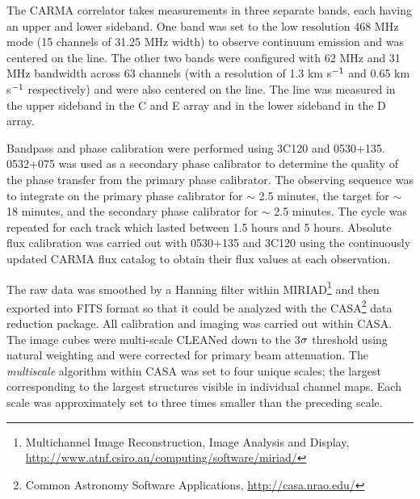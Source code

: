 \documentclass[iop]{emulateapj}
\begin{document}
The CARMA correlator takes measurements in three separate bands, each having an upper and lower sideband. One band was set to the low resolution 468 MHz mode (15 channels of 31.25 MHz width) to observe continuum emission and was centered on the line. The other two bands were configured with 62 MHz and 31 MHz bandwidth across 63 channels (with a resolution of 1.3 km s$\rm{{}^{-1}}$ and 0.65 km s$\rm{{}^{-1}}$ respectively) and were also centered on the line. The line was measured in the upper sideband in the C and E array and in the lower sideband in the D array.

Bandpass and phase calibration were performed using 3C120 and 0530+135. 0532+075 was used as a secondary phase calibrator to determine the quality of the phase transfer from the primary phase calibrator. The observing sequence was to integrate on the primary phase calibrator for $\sim$ 2.5 minutes, the target for $\sim$ 18 minutes, and the secondary phase calibrator for $\sim$ 2.5 minutes. The cycle was repeated for each track which lasted between 1.5 hours and 5 hours. Absolute flux calibration was carried out with 0530+135 and 3C120 using the continuously updated CARMA flux catalog to obtain their flux values at each observation.

The raw data was smoothed by a Hanning filter within MIRIAD\footnote{Multichannel Image Reconstruction, Image Analysis and Display, \url{http://www.atnf.csiro.au/computing/software/miriad/}} and then exported into FITS format so that it could be analyzed with the CASA\footnote{Common Astronomy Software Applications, \url{http://casa.nrao.edu/}} data reduction package. All calibration and imaging was carried out within CASA. The image cubes  were multi-scale  CLEANed down to the 3$\rm{\sigma}$ threshold using natural weighting and were corrected for primary beam attenuation. The \textit{multiscale} algorithm \citep{2008AJ....136.2897R} within CASA was set to four unique scales; the largest corresponding to the largest structures visible in individual channel maps. Each scale was approximately set to three times smaller than the preceding scale. 
\end{document}
